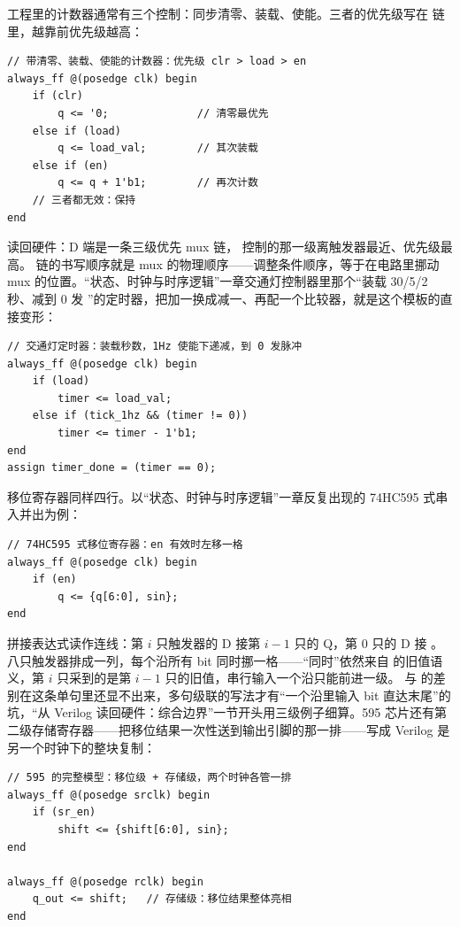 工程里的计数器通常有三个控制：同步清零、装载、使能。三者的优先级写在  链里，越靠前优先级越高：

\begin{lstlisting}
// 带清零、装载、使能的计数器：优先级 clr > load > en
always_ff @(posedge clk) begin
    if (clr)
        q <= '0;              // 清零最优先
    else if (load)
        q <= load_val;        // 其次装载
    else if (en)
        q <= q + 1'b1;        // 再次计数
    // 三者都无效：保持
end
\end{lstlisting}

读回硬件：D 端是一条三级优先 mux 链， 控制的那一级离触发器最近、优先级最高。 链的书写顺序就是 mux 的物理顺序——调整条件顺序，等于在电路里挪动 mux 的位置。“状态、时钟与时序逻辑”一章交通灯控制器里那个“装载 30/5/2 秒、减到 0 发 ”的定时器，把加一换成减一、再配一个比较器，就是这个模板的直接变形：

\begin{lstlisting}
// 交通灯定时器：装载秒数，1Hz 使能下递减，到 0 发脉冲
always_ff @(posedge clk) begin
    if (load)
        timer <= load_val;
    else if (tick_1hz && (timer != 0))
        timer <= timer - 1'b1;
end
assign timer_done = (timer == 0);
\end{lstlisting}

移位寄存器同样四行。以“状态、时钟与时序逻辑”一章反复出现的 74HC595 式串入并出为例：

\begin{lstlisting}
// 74HC595 式移位寄存器：en 有效时左移一格
always_ff @(posedge clk) begin
    if (en)
        q <= {q[6:0], sin};
end
\end{lstlisting}

拼接表达式读作连线：第 $i$ 只触发器的 D 接第 $i-1$ 只的 Q，第 0 只的 D 接 。八只触发器排成一列，每个沿所有 bit 同时挪一格——“同时”依然来自 \code{<=} 的旧值语义，第 $i$ 只采到的是第 $i-1$ 只的旧值，串行输入一个沿只能前进一级。\code{<=} 与 \code{=} 的差别在这条单句里还显不出来，多句级联的写法才有“一个沿里输入 bit 直达末尾”的坑，“从 Verilog 读回硬件：综合边界”一节开头用三级例子细算。595 芯片还有第二级存储寄存器——把移位结果一次性送到输出引脚的那一排——写成 Verilog 是另一个时钟下的整块复制：

\begin{lstlisting}
// 595 的完整模型：移位级 + 存储级，两个时钟各管一排
always_ff @(posedge srclk) begin
    if (sr_en)
        shift <= {shift[6:0], sin};
end

always_ff @(posedge rclk) begin
    q_out <= shift;   // 存储级：移位结果整体亮相
end
\end{lstlisting}

